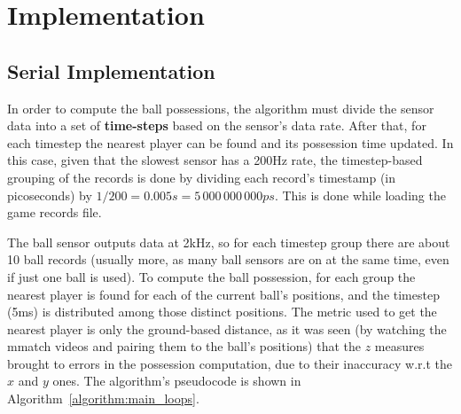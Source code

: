 \documentclass[a4paper, 10pt]{article}
\begin{document}
\section*{Implementation}

\subsection*{Serial Implementation}
In order to compute the ball possessions, the algorithm must divide the sensor data into a set of {\bf time-steps} based on the sensor's data rate.
After that, for each timestep the nearest player can be found and its possession time updated.
In this case, given that the slowest sensor has a 200Hz rate, the timestep-based grouping of the records is done by dividing each record's timestamp (in picoseconds) by $1 / 200 = 0.005s = 5\,000\,000\,000ps$.
This is done while loading the game records file.


The ball sensor outputs data at 2kHz, so for each timestep group there are about 10 ball records (usually more, as many ball sensors are on at the same time, even if just one ball is used).
To compute the ball possession, for each group the nearest player is found for each of the current ball's positions, and the timestep (5ms) is distributed among those distinct positions.
The metric used to get the nearest player is only the ground-based distance, as it was seen (by watching the mmatch videos and pairing them to the ball's positions) that the $z$ measures brought to errors in the possession computation, due to their inaccuracy w.r.t the $x$ and $y$ ones.
The algorithm's pseudocode is shown in Algorithm~\ref{algorithm:main_loops}.
\end{document}
